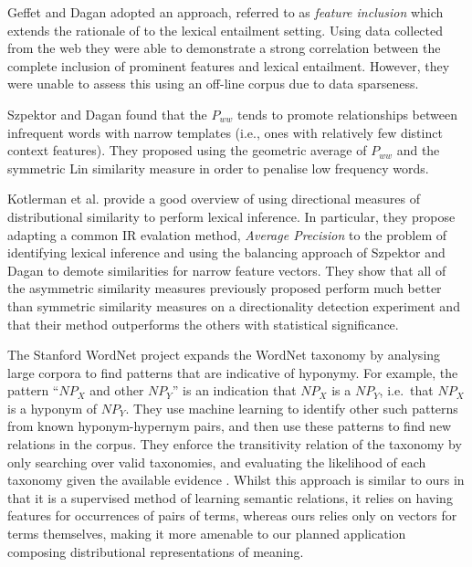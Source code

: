 \documentclass[11pt]{article}
\begin{document}
Geffet and Dagan  adopted an approach, referred to as \emph{feature inclusion} which extends the rationale of  to the lexical entailment setting.    Using data collected from the web they were able to demonstrate a strong correlation between the complete inclusion of prominent features and lexical entailment.  However, they were unable to assess this using an off-line corpus due to data sparseness.

Szpektor and Dagan  found that the $P_{ww}$ tends to promote relationships between infrequent words with narrow templates (i.e., ones with relatively few distinct context features).  They proposed using the geometric average of $P_{ww}$ and the symmetric Lin similarity measure in order to penalise low frequency words.   

Kotlerman et al.  provide a good overview of using directional measures of distributional similarity to perform lexical inference.  In particular, they propose adapting a common IR evalation method, \emph{Average Precision} to the problem of identifying lexical inference and using the balancing approach of Szpektor and Dagan  to demote similarities for narrow feature vectors.  They show that all of the asymmetric similarity measures previously proposed perform much better than symmetric similarity measures on a directionality detection experiment and that their method outperforms the others with statistical significance.

The Stanford WordNet project \cite{Snow:04} expands the WordNet
taxonomy by analysing large corpora to find patterns that are
indicative of hyponymy. For example, the pattern ``$\mathit{NP}_X$ and
other $\mathit{NP}_Y$'' is an indication that $\mathit{NP}_X$ is a
$\mathit{NP}_Y$, i.e.~that $\mathit{NP}_X$ is a hyponym of
$\mathit{NP}_Y$. They use machine learning to identify other such
patterns from known hyponym-hypernym pairs, and then use these
patterns to find new relations in the corpus. They enforce the
transitivity relation of the taxonomy by only searching over valid
taxonomies, and evaluating the likelihood of each taxonomy given the
available evidence \cite{Snow:06}. Whilst this approach is similar to
ours in that it is a supervised method of learning semantic relations,
it relies on having features for occurrences of pairs of terms,
whereas ours relies only on vectors for terms themselves, making it
more amenable to our planned application composing distributional
representations of meaning.
\end{document}
